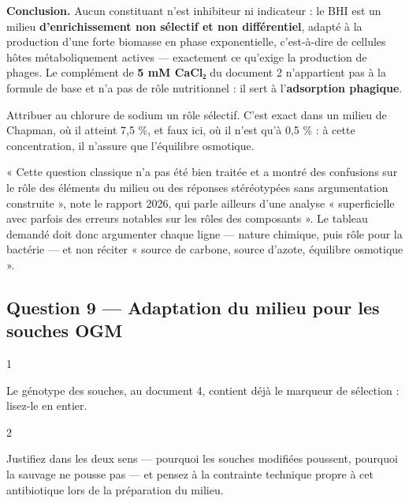 \documentclass[11pt,a4paper]{article}
\begin{document}
\textbf{Conclusion.} Aucun constituant n'est inhibiteur ni indicateur : le BHI est un milieu \textbf{d'enrichissement non sélectif et non différentiel}, adapté à la production d'une forte biomasse en phase exponentielle, c'est-à-dire de cellules hôtes métaboliquement actives --- exactement ce qu'exige la production de phages. Le complément de \textbf{5 mM CaCl₂} du document 2 n'appartient pas à la formule de base et n'a pas de rôle nutritionnel : il sert à l'\textbf{adsorption phagique}.

\begin{piege}

Attribuer au chlorure de sodium un rôle sélectif. C'est exact dans un milieu de Chapman, où il atteint 7,5 \%, et faux ici, où il n'est qu'à 0,5 \% : à cette concentration, il n'assure que l'équilibre osmotique.

\end{piege}

\begin{jury}

« Cette question classique n'a pas été bien traitée et a montré des confusions sur le rôle des éléments du milieu ou des réponses stéréotypées sans argumentation construite », note le rapport 2026, qui parle ailleurs d'une analyse « superficielle avec parfois des erreurs notables sur les rôles des composants ». Le tableau demandé doit donc argumenter chaque ligne --- nature chimique, puis rôle pour la bactérie --- et non réciter « source de carbone, source d'azote, équilibre osmotique ».

\end{jury}

\hypertarget{question-9-adaptation-du-milieu-pour-les-souches-ogm}{%
\subsection{Question 9 --- Adaptation du milieu pour les souches OGM}\label{question-9-adaptation-du-milieu-pour-les-souches-ogm}}

\begin{indication}{1}

Le génotype des souches, au document 4, contient déjà le marqueur de sélection : lisez-le en entier.

\end{indication}

\begin{indication}{2}

Justifiez dans les deux sens --- pourquoi les souches modifiées poussent, pourquoi la sauvage ne pousse pas --- et pensez à la contrainte technique propre à cet antibiotique lors de la préparation du milieu.

\end{indication}
\end{document}
